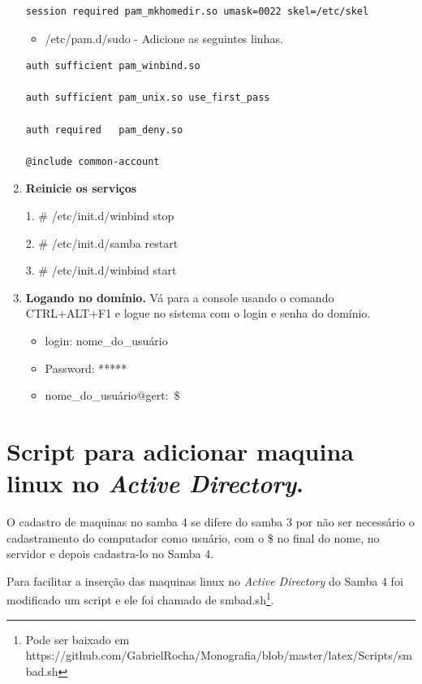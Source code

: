 \begin{enumerate}
\begin{lstlisting}
session required pam_mkhomedir.so umask=0022 skel=/etc/skel
		\end{lstlisting}

		\begin{itemize}
			\item {/etc/pam.d/sudo} - Adicione as seguintes linhas.\\
		\end{itemize}

		\begin{lstlisting}
auth sufficient pam_winbind.so

auth sufficient pam_unix.so use_first_pass

auth required   pam_deny.so

@include common-account
		\end{lstlisting}

	\item \textbf{Reinicie os serviços}

			1. \# /etc/init.d/winbind stop
			
			2. \# /etc/init.d/samba restart		
			
			3. \# /etc/init.d/winbind start
			
	\item \textbf{Logando no domínio.}
		Vá para a console usando o comando CTRL+ALT+F1 e logue no sistema com o login e senha do domínio.

		\begin{itemize}
			\item {login: nome\_do\_usuário}
			\item {Password: *****}
			\item {nome\_do\_usuário$@$gert:~\$}
		\end{itemize}

\end{enumerate}

\section{Script para adicionar maquina linux no \textit{Active Directory}.}

O cadastro de maquinas no samba 4 se difere do samba 3 por não ser necessário o cadastramento do computador como usuário, com o \$ no final do nome, no servidor e depois cadastra-lo no Samba 4.

Para facilitar a inserção das maquinas linux no \textit{Active Directory} do Samba 4 foi modificado um script e ele foi chamado de smbad.sh\footnote[4]{Pode ser baixado em https://github.com/GabrielRocha/Monografia/blob/master/latex/Scripts/smbad.sh}. 

